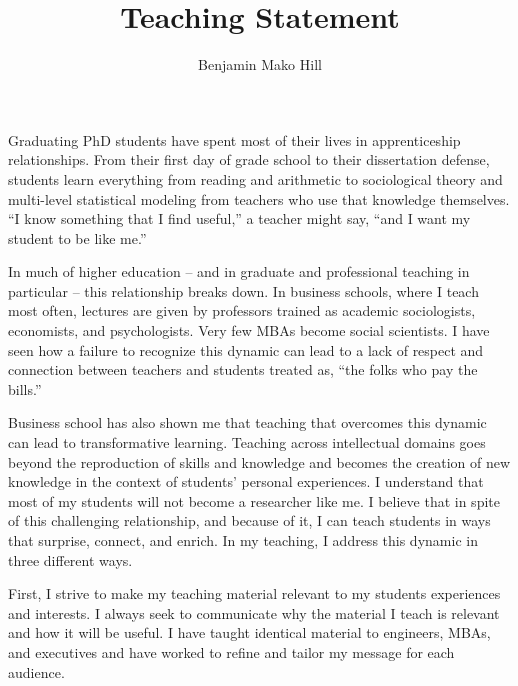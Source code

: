 \documentclass[10pt]{memoir}
\begin{document}
\setlength{\parskip}{4.5pt}

\baselineskip 14.5pt

\title{Teaching Statement}
\author{Benjamin Mako Hill}
\date{}


\maketitle

Graduating PhD students have spent most of their lives in
apprenticeship relationships. From their first day of grade school to
their dissertation defense, students learn everything from reading and
arithmetic to sociological theory and multi-level statistical modeling
from teachers who use that knowledge themselves.  ``I know something
that I find useful,'' a teacher might say, ``and I want my student to
be like me.''

In much of higher education -- and in graduate and professional
teaching in particular -- this relationship breaks down. In business
schools, where I teach most often, lectures are given by professors
trained as academic sociologists, economists, and psychologists. Very
few MBAs become social scientists. I have seen how a failure to
recognize this dynamic can lead to a lack of respect and connection
between teachers and students treated as, ``the folks who pay the
bills.''

Business school has also shown me that teaching that overcomes this
dynamic can lead to transformative learning. Teaching across
intellectual domains goes beyond the reproduction of skills and
knowledge and becomes the creation of new knowledge in the context of
students' personal experiences. I understand that most of my students
will not become a researcher like me. I believe that in spite of this
challenging relationship, and because of it, I can teach students in
ways that surprise, connect, and enrich. In my teaching, I address
this dynamic in three different ways.

First, I strive to make my teaching material relevant to my students
experiences and interests. I always seek to communicate why the
material I teach is relevant and how it will be useful. I have taught
identical material to engineers, MBAs, and executives and have worked
to refine and tailor my message for each audience.
\end{document}
